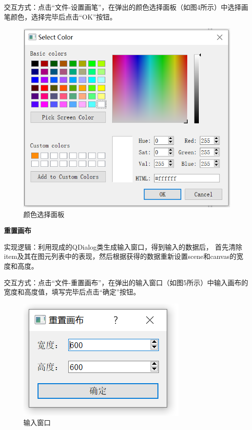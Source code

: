\documentclass[a4paper,UTF8]{article}
\theoremstyle{definition}
\begin{document}
交互方式：点击“文件-设置画笔”，在弹出的颜色选择面板（如图4所示）中选择画笔颜色，选择完毕后点击“OK”按钮。
\begin{figure}[H]
    \centering
    \includegraphics[scale=0.75]{select-color.PNG}
    \caption{颜色选择面板}
\end{figure}

\textbf{重置画布}

实现逻辑：利用现成的QDialog类生成输入窗口，得到输入的数据后，
首先清除item及其在图元列表中的表现，然后根据获得的数据重新设置scene和canvas的宽度和高度。

交互方式：点击“文件-重置画布”，在弹出的输入窗口（如图5所示）中输入画布的宽度和高度值，填写完毕后点击“确定”按钮。
\begin{figure}[H]
    \centering
    \includegraphics[scale=1]{reset-canvas.PNG}
    \caption{输入窗口}
\end{figure}
\end{document}
